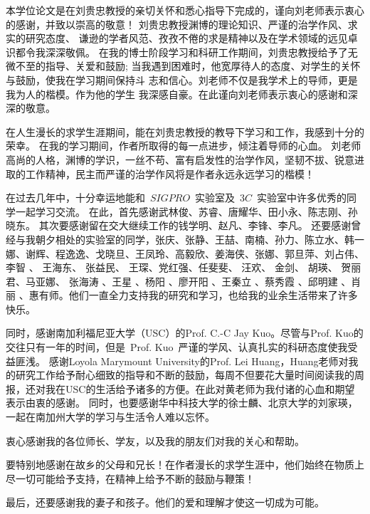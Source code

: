 \par 本学位论文是在刘贵忠教授的亲切关怀和悉心指导下完成的，谨向刘老师表示衷心的感谢，并致以崇高的敬意！
刘贵忠教授渊博的理论知识、严谨的治学作风、求实的研究态度、
谦逊的学者风范、孜孜不倦的求是精神以及在学术领域的远见卓识都令我深深敬佩。
在我的博士阶段学习和科研工作期间，刘贵忠教授给予了无微不至的指导、关爱和鼓励;
当我遇到困难时，他宽厚待人的态度、对学生的关怀与鼓励，使我在学习期间保持斗
志和信心。刘老师不仅是我学术上的导师，更是我为人的楷模。作为他的学生
我深感自豪。在此谨向刘老师表示衷心的感谢和深深的敬意。

在人生漫长的求学生涯期间，能在刘贵忠教授的教导下学习和工作，我感到十分的荣幸。
在我的学习期间，作者所取得的每一点进步，倾注着导师的心血。
刘老师高尚的人格，渊博的学识，一丝不苟、富有启发性的治学作风，坚韧不拔、锐意进取的工作精神，民主而严谨的治学作风将是作者永远永远学习的楷模！

\par 在过去几年中，十分幸运地能和~$SIGPRO$~实验室及~$3C$~实验室中许多优秀的同学一起学习交流。
在此，首先感谢武林俊、苏睿、唐耀华、田小永、陈志刚、孙晓东。
其次要感谢留在交大继续工作的钱学明、赵凡、李锋、李凡。
还要感谢曾经与我朝夕相处的实验室的同学，张庆、张静、王喆、南楠、孙力、陈立水、韩一娜、谢辉、程逸逸、戈晓旦、王凤玲、高毅欣、姜海侠、张娜、郭旦萍、刘占伟、李智 、 王海东、 张益民、 王琛、党红强、任斐斐、 汪欢、 金剑、 胡瑛、 贺丽君、马亚娜、 张海涛 、王星 、杨阳 、廖开阳 、王秦立 、蔡秀霞 、邱明建 、肖丽 、惠有师。他们一直全力支持我的研究和学习，也给我的业余生活带来了许多快乐。

\par 同时，感谢南加利福尼亚大学（USC）的Prof. C.-C Jay Kuo。尽管与Prof. Kuo的交往只有一年的时间，但是~Prof. Kuo~严谨的学风、认真扎实的科研态度使我受益匪浅。
感谢Loyola Marymount University的Prof. Lei Huang，Huang老师对我的研究工作给予耐心细致的指导和不断的鼓励，每周不但要花大量时间阅读我的周报，还对我在USC的生活给予诸多的方便。在此对黄老师为我付诸的心血和期望表示由衷的感谢。
同时，也要感谢华中科技大学的徐士麟、北京大学的刘家瑛，一起在南加州大学的学习与生活令人难以忘怀。

\par 衷心感谢我的各位师长、学友，以及我的朋友们对我的关心和帮助。 
\par 要特别地感谢在故乡的父母和兄长！在作者漫长的求学生涯中，他们始终在物质上尽一切可能给予支持，在精神上给予不断的鼓励与鞭策！

\par 最后，还要感谢我的妻子和孩子。他们的爱和理解才使这一切成为可能。
